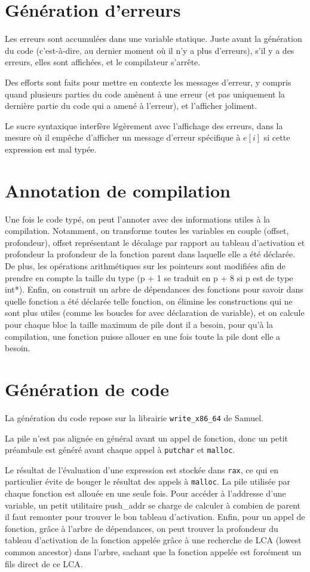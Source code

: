 \documentclass{scrartcl}
\begin{document}
\section*{Génération d'erreurs}
Les erreurs sont accumulées dans une variable statique. Juste avant la génération
du code (c'est-à-dire, au dernier moment où il n'y a plus d'erreurs), s'il y a
des erreurs, elles sont affichées, et le compilateur s'arrête.\par
Des efforts sont faits pour mettre en contexte les messages d'erreur, y compris
quand plusieurs parties du code amènent à une erreur (et pas uniquement la
dernière partie du code qui a amené à l'erreur), et l'afficher joliment.\par
Le sucre syntaxique interfère légèrement avec l'affichage des erreurs, dans la
mesure où il empêche d'afficher un message d'erreur spécifique à \(e[i]\) si
cette expression est mal typée.

\section*{Annotation de compilation}
Une fois le code typé, on peut l'annoter avec des informations utiles à la compilation.
Notamment, on transforme toutes les variables en couple (offset, profondeur), offset représentant
le décalage par rapport au tableau d'activation et profondeur la profondeur de la fonction parent dans
laquelle elle a été déclarée. De plus, les opérations arithmétiques sur les pointeurs sont modifiées afin
de prendre en compte la taille du type (p + 1 se traduit en p + 8 si p est de type int*). Enfin,
on construit un arbre de dépendances des fonctions pour savoir dans quelle fonction a été déclarée
telle fonction, on élimine les constructions qui ne sont plus utiles (comme les boucles for avec
déclaration de variable), et on calcule pour chaque bloc la taille maximum de pile dont il a besoin,
pour qu'à la compilation, une fonction puisse allouer en une fois toute la pile dont elle a besoin.

\section*{Génération de code}
La génération du code repose sur la librairie \verb|write_x86_64| de Samuel.\par
La pile n'est pas alignée en général avant un appel de fonction, donc un petit
préambule est généré avant chaque appel à \verb|putchar| et \verb|malloc|.\par
Le résultat de l'évaluation d'une expression est stockée dans \verb|rax|, ce qui
en particulier évite de bouger le résultat des appels à \verb|malloc|. La pile
utilisée par chaque fonction est allouée en une seule fois. Pour accéder à l'addresse
d'une variable, un petit utilitaire push_addr se charge de calculer à combien de parent
il faut remonter pour trouver le bon tableau d'activation. Enfin, pour un appel de fonction,
grâce à l'arbre de dépendances, on peut trouver la profondeur du tableau d'activation de la
fonction appelée grâce à une recherche de LCA (lowest common ancestor) dans l'arbre, sachant
que la fonction appelée est forcément un fils direct de ce LCA.
\end{document}
